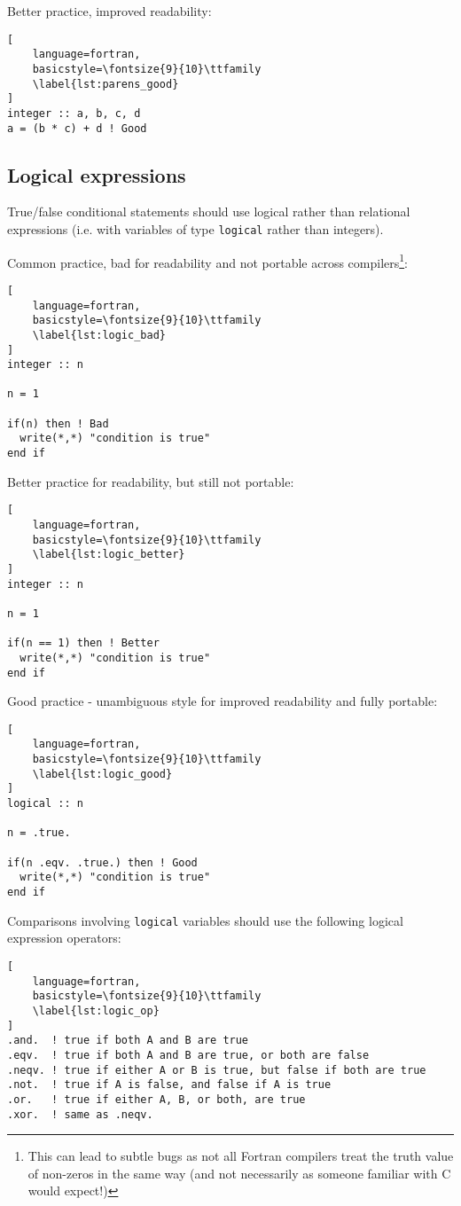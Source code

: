 \documentclass[11pt]{report}
\begin{document}
Better practice, improved readability:
\begin{lstlisting}[
	language=fortran,
    basicstyle=\fontsize{9}{10}\ttfamily
    \label{lst:parens_good}
]
integer :: a, b, c, d
a = (b * c) + d ! Good
\end{lstlisting}

\subsection{Logical expressions}
True/false conditional statements should use logical rather than relational expressions (i.e. with variables of 
type \texttt{logical} rather than integers). 

Common practice, bad for readability and not portable across compilers\footnote{This can lead to subtle bugs as not all Fortran
  compilers treat the truth value of non-zeros in the same way (and not necessarily as someone
  familiar with C would expect!)}:
\begin{lstlisting}[
	language=fortran,
    basicstyle=\fontsize{9}{10}\ttfamily
    \label{lst:logic_bad}
]
integer :: n

n = 1

if(n) then ! Bad
  write(*,*) "condition is true"
end if
\end{lstlisting}

Better practice for readability, but still not portable:
\begin{lstlisting}[
	language=fortran,
    basicstyle=\fontsize{9}{10}\ttfamily
    \label{lst:logic_better}
]
integer :: n

n = 1

if(n == 1) then ! Better
  write(*,*) "condition is true"
end if
\end{lstlisting}

Good practice - unambiguous style for improved readability and fully portable:

\begin{lstlisting}[
	language=fortran,
    basicstyle=\fontsize{9}{10}\ttfamily
    \label{lst:logic_good}
]
logical :: n

n = .true.

if(n .eqv. .true.) then ! Good
  write(*,*) "condition is true"
end if
\end{lstlisting}



Comparisons involving \texttt{logical} variables should use the 
following logical expression operators:
\begin{lstlisting}[
	language=fortran,
    basicstyle=\fontsize{9}{10}\ttfamily
    \label{lst:logic_op}
]
.and.  ! true if both A and B are true 
.eqv.  ! true if both A and B are true, or both are false
.neqv. ! true if either A or B is true, but false if both are true
.not.  ! true if A is false, and false if A is true
.or.   ! true if either A, B, or both, are true
.xor.  ! same as .neqv. 
\end{lstlisting}
\end{document}
